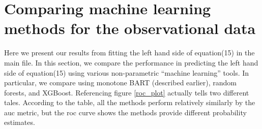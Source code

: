 \documentclass[aoas,preprint, 11pt, dvipsnames, table, x11name]{imsart}
\theoremstyle{remark}
\begin{document}
	\section{Comparing machine learning methods for the observational data}\label{machine_append}
	Here we present our results from fitting the left hand side of equation(15) in the main file.
	In this section, we compare the performance in predicting the left hand side of equation(15) using various non-parametric ``machine learning'' tools.  In particular, we compare using monotone BART (described earlier), random forests, and XGBoost. Referencing figure \ref{roc_plot} actually tells two different tales.  According to the table, all the methods perform relatively similarly by the auc metric, but the roc curve shows the methods provide different probability estimates. 
	
	
	
	
	
	
	
\end{document}
